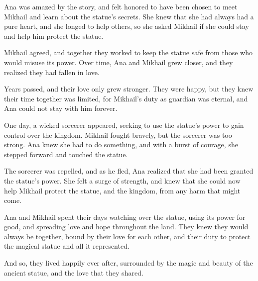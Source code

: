 \documentclass[a4paper]{article}
\begin{document}
\hspace{10pt} Ana was amazed by the story, and felt honored to have been chosen to meet Mikhail and learn about the statue's secrets. She knew that she had always had a pure heart, and she longed to help others, so she asked Mikhail if she could stay and help him protect the statue.\vspace{1ex}

\hspace{10pt} Mikhail agreed, and together they worked to keep the statue safe from those who would misuse its power. Over time, Ana and Mikhail grew closer, and they realized they had fallen in love.\vspace{1ex}

\hspace{10pt} Years passed, and their love only grew stronger. They were happy, but they knew their time together was limited, for Mikhail's duty as guardian was eternal, and Ana could not stay with him forever.\vspace{1ex}

\hspace{10pt} One day, a wicked sorcerer appeared, seeking to use the statue's power to gain control over the kingdom. Mikhail fought bravely, but the sorcerer was too strong. Ana knew she had to do something, and with a burst of courage, she stepped forward and touched the statue.\vspace{1ex}

\hspace{10pt} The sorcerer was repelled, and as he fled, Ana realized that she had been granted the statue's power. She felt a surge of strength, and knew that she could now help Mikhail protect the statue, and the kingdom, from any harm that might come.\vspace{1ex}

\hspace{10pt} Ana and Mikhail spent their days watching over the statue, using its power for good, and spreading love and hope throughout the land. They knew they would always be together, bound by their love for each other, and their duty to protect the magical statue and all it represented.\vspace{1ex}

\hspace{10pt} And so, they lived happily ever after, surrounded by the magic and beauty of the ancient statue, and the love that they shared.

\rmfamily
\end{document}
